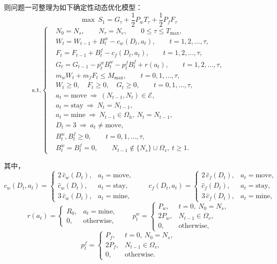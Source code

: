 则问题一可整理为如下确定性动态优化模型：
\begin{equation}
\max \ S_1
=G_{\tau}+\frac{1}{2}P_wT_{\tau}+\frac{1}{2}P_fF_{\tau}
\label{eq:q1_obj}
\end{equation}
\[
\mathrm{s.t.}\left\{
\begin{aligned}
&N_0=N_s,\qquad N_{\tau}=N_e,\qquad 0\le \tau \le T_{\max},\\[2mm]
&W_t=W_{t-1}+B_t^w-c_w(D_t,a_t), \qquad t=1,2,\dots,\tau,\\[1mm]
&F_t=F_{t-1}+B_t^f-c_f(D_t,a_t), \qquad t=1,2,\dots,\tau,\\[1mm]
&G_t=G_{t-1}-p_t^wB_t^w-p_t^fB_t^f+r(a_t), \qquad t=1,2,\dots,\tau,\\[1mm]
&m_wW_t+m_fF_t\le M_{\max}, \qquad t=0,1,\dots,\tau,\\[1mm]
&W_t\ge 0,\quad F_t\ge 0,\quad G_t\ge 0,\qquad t=0,1,\dots,\tau,\\[1mm]
&a_t=\text{move}\ \Rightarrow\ (N_{t-1},N_t)\in\mathcal{E},\\[1mm]
&a_t=\text{stay}\ \Rightarrow\ N_t=N_{t-1},\\[1mm]
&a_t=\text{mine}\ \Rightarrow\ N_{t-1}\in\Omega_h,\ N_t=N_{t-1},\\[1mm]
&D_t=3\ \Rightarrow\ a_t\neq \text{move},\\[1mm]
&B_t^w,B_t^f\ge 0,\qquad t=0,1,\dots,\tau,\\[1mm]
&B_t^w=B_t^f=0,\qquad N_{t-1}\notin \{N_s\}\cup\Omega_v,\ t\ge 1.
\end{aligned}
\right.
\label{eq:q1_cons}
\]

其中，
\[
c_w(D_t,a_t)=
\begin{cases}
2\,\hat c_w(D_t), & a_t=\text{move},\\
\hat c_w(D_t), & a_t=\text{stay},\\
3\,\hat c_w(D_t), & a_t=\text{mine},
\end{cases}
\qquad
c_f(D_t,a_t)=
\begin{cases}
2\,\hat c_f(D_t), & a_t=\text{move},\\
\hat c_f(D_t), & a_t=\text{stay},\\
3\,\hat c_f(D_t), & a_t=\text{mine},
\end{cases}
\]
\[
r(a_t)=
\begin{cases}
R_0, & a_t=\text{mine},\\
0, & \text{otherwise},
\end{cases}
\qquad
p_t^w=
\begin{cases}
P_w, & t=0,\ N_0=N_s,\\
2P_w, & N_{t-1}\in\Omega_v,\\
0, & \text{otherwise},
\end{cases}
\]
\[
p_t^f=
\begin{cases}
P_f, & t=0,\ N_0=N_s,\\
2P_f, & N_{t-1}\in\Omega_v,\\
0, & \text{otherwise}.
\end{cases}
\]

